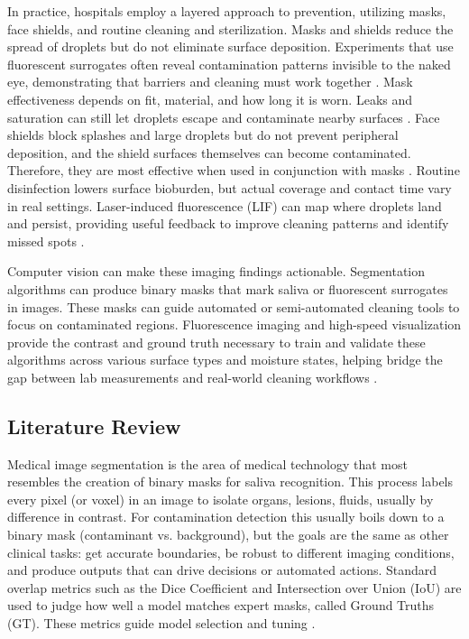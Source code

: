 In practice, hospitals employ a layered approach to prevention, utilizing masks, face shields, and routine cleaning and sterilization. Masks and shields reduce the spread of droplets but do not eliminate surface deposition. Experiments that use fluorescent surrogates often reveal contamination patterns invisible to the naked eye, demonstrating that barriers and cleaning must work together \cite{shah2021assessment}. Mask effectiveness depends on fit, material, and how long it is worn. Leaks and saturation can still let droplets escape and contaminate nearby surfaces \cite{chang2020aerial}. Face shields block splashes and large droplets but do not prevent peripheral deposition, and the shield surfaces themselves can become contaminated. Therefore, they are most effective when used in conjunction with masks \cite{shah2021assessment,chang2020aerial}. Routine disinfection lowers surface bioburden, but actual coverage and contact time vary in real settings. Laser-induced fluorescence (LIF) can map where droplets land and persist, providing useful feedback to improve cleaning patterns and identify missed spots \cite{wu2024quantitative}.

Computer vision can make these imaging findings actionable. Segmentation algorithms can produce binary masks that mark saliva or fluorescent surrogates in images. These masks can guide automated or semi-automated cleaning tools to focus on contaminated regions. Fluorescence imaging and high-speed visualization provide the contrast and ground truth necessary to train and validate these algorithms across various surface types and moisture states, helping bridge the gap between lab measurements and real-world cleaning workflows \cite{miranda2014fluorescence,shah2021assessment,chang2020aerial,wu2024quantitative}.

\subsection{Literature Review}

Medical image segmentation is the area of medical technology that most resembles the creation of binary masks for saliva recognition. This process labels every pixel (or voxel) in an image to isolate organs, lesions, fluids, usually by difference in contrast. For contamination detection this usually boils down to a binary mask (contaminant vs. background), but the goals are the same as other clinical tasks: get accurate boundaries, be robust to different imaging conditions, and produce outputs that can drive decisions or automated actions. Standard overlap metrics such as the Dice Coefficient and Intersection over Union (IoU) are used to judge how well a model matches expert masks, called Ground Truths (GT). These metrics guide model selection and tuning \cite{ren2022medical}.

